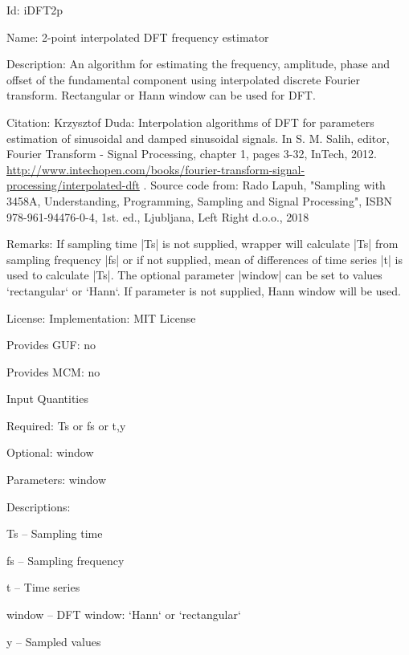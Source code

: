 \begin{tightdesc}
\item [Id:] iDFT2p
\item [Name:] 2-point interpolated DFT frequency estimator
\item [Description:] An algorithm for estimating the frequency, amplitude, phase and offset of the fundamental component using interpolated discrete Fourier transform. Rectangular or Hann window can be used for DFT.
\item [Citation:] Krzysztof Duda: Interpolation algorithms of DFT for parameters estimation of sinusoidal and damped sinusoidal signals. In S. M. Salih, editor, Fourier Transform - Signal Processing, chapter 1, pages 3-32, InTech, 2012. \url{http://www.intechopen.com/books/fourier-transform-signal-processing/interpolated-dft} . Source code from: Rado Lapuh, "Sampling with 3458A, Understanding, Programming, Sampling and Signal Processing", ISBN 978-961-94476-0-4, 1st. ed., Ljubljana, Left Right d.o.o., 2018
\item [Remarks:] If sampling time |Ts| is not supplied, wrapper will calculate |Ts| from sampling frequency |fs| or if not supplied, mean of differences of time series |t| is used to calculate |Ts|. The optional parameter |window| can be set to values `rectangular` or `Hann`. If parameter is not supplied, Hann window will be used.
\item [License:] Implementation: MIT License
\item [Provides GUF:] no
\item [Provides MCM:] no
\item [Input Quantities] \rule{0em}{0em}
    \begin{tightdesc}
    \item [Required:] 
        \textsf{Ts} or \textsf{fs} or \textsf{t},\enspace \textsf{y}
    \item [Optional:] 
        \textsf{window}
    \item [Parameters:] 
        \textsf{window}
    \item [Descriptions:] \rule{0em}{0em}
        \begin{tightdesc}
            \item[\textsf{Ts}] -- Sampling time
            \item[\textsf{fs}] -- Sampling frequency
            \item[\textsf{t}] -- Time series
            \item[\textsf{window}] -- DFT window: `Hann` or `rectangular`
            \item[\textsf{y}] -- Sampled values

\end{tightdesc}
\end{tightdesc}
\end{tightdesc}
